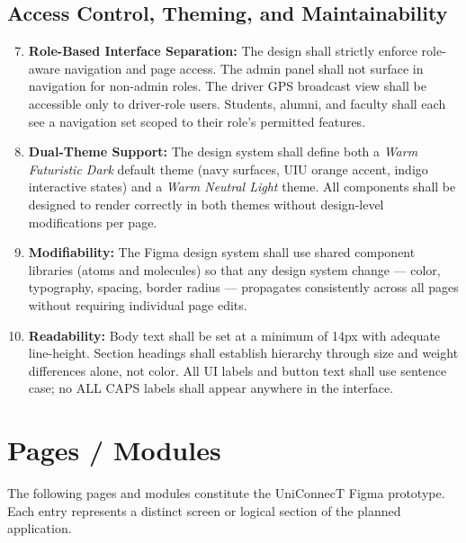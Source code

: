 \documentclass[12pt, a4paper]{article}
\begin{document}
\subsection{Access Control, Theming, and Maintainability}

\begin{enumerate}[label=\textbf{NFR-\arabic*:}, leftmargin=*, align=left]
\setcounter{enumi}{6}

    \item \textbf{Role-Based Interface Separation:} The design shall strictly enforce
    role-aware navigation and page access. The admin panel shall not surface in
    navigation for non-admin roles. The driver GPS broadcast view shall be accessible
    only to driver-role users. Students, alumni, and faculty shall each see a
    navigation set scoped to their role's permitted features.

    \item \textbf{Dual-Theme Support:} The design system shall define both a
    \textit{Warm Futuristic Dark} default theme (navy surfaces, UIU orange accent,
    indigo interactive states) and a \textit{Warm Neutral Light} theme. All
    components shall be designed to render correctly in both themes without
    design-level modifications per page.

    \item \textbf{Modifiability:} The Figma design system shall use shared component
    libraries (atoms and molecules) so that any design system change --- color,
    typography, spacing, border radius --- propagates consistently across all pages
    without requiring individual page edits.

    \item \textbf{Readability:} Body text shall be set at a minimum of 14px with
    adequate line-height. Section headings shall establish hierarchy through size
    and weight differences alone, not color. All UI labels and button text shall use
    sentence case; no ALL CAPS labels shall appear anywhere in the interface.

\end{enumerate}

\clearpage
\section{Pages / Modules}

The following pages and modules constitute the UniConnecT Figma prototype. Each entry
represents a distinct screen or logical section of the planned application.
\end{document}
